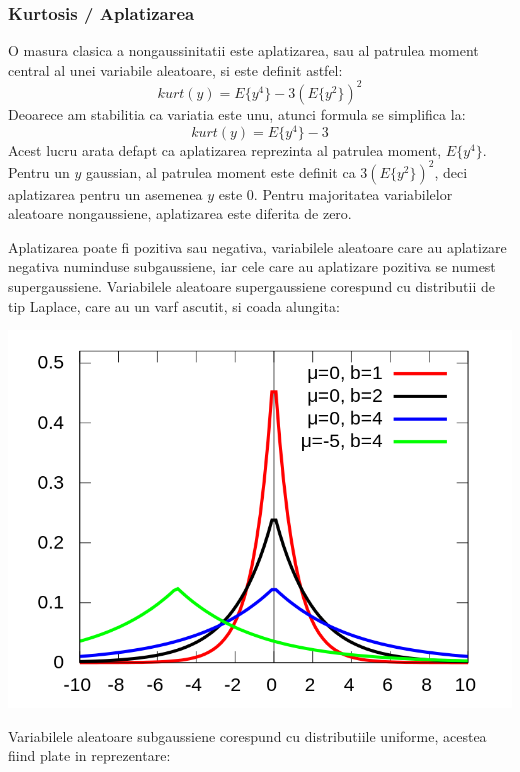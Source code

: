 \documentclass[12pt]{article}
\begin{document}
\subsubsection{Kurtosis / Aplatizarea}
O masura clasica a nongaussinitatii este aplatizarea, sau al patrulea moment central al unei variabile aleatoare, si este definit astfel:
\begin{equation}
kurt(y)=E\{y^4\}-3(E\{y^2\})^2
\end{equation}
Deoarece am stabilitia ca variatia este unu, atunci formula se simplifica la:
\begin{equation}
kurt(y)=E\{y^4\}-3
\end{equation}
Acest lucru arata defapt ca aplatizarea reprezinta al patrulea moment, $E\{y^4\}$. Pentru un $y$ gaussian, al patrulea moment este definit ca $3(E\{y^2\})^2$, deci aplatizarea pentru un asemenea $y$ este 0. Pentru majoritatea variabilelor aleatoare nongaussiene, aplatizarea este diferita de zero.

Aplatizarea poate fi pozitiva sau negativa, variabilele aleatoare care au aplatizare negativa numinduse subgaussiene, iar cele care au aplatizare pozitiva se numest supergaussiene. Variabilele aleatoare supergaussiene corespund cu distributii de tip Laplace, care au un varf ascutit, si coada alungita:
\begin{center}
	\includegraphics[scale=0.25]{laplace_distribution}
 \end{center}

 Variabilele aleatoare subgaussiene corespund cu distributiile uniforme, acestea fiind plate in reprezentare:
\end{document}
